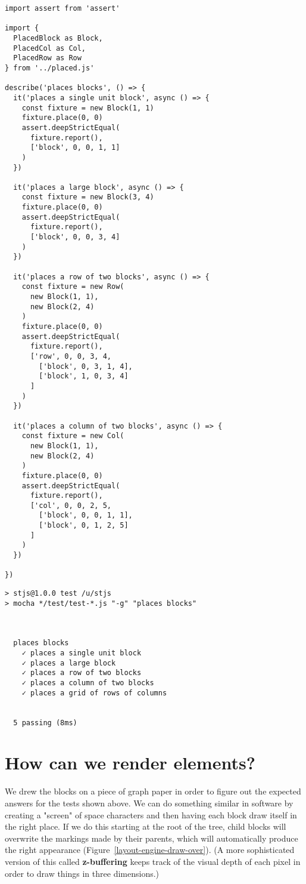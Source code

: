 \documentclass[krantzl]{krantz}
\newcommand{\figref}[1]{Figure~\ref{#1}}
\newcommand{\glossref}[1]{\textbf{#1}}
\begin{document}
\begin{lstlisting}[frame=single,frameround=tttt]
import assert from 'assert'

import {
  PlacedBlock as Block,
  PlacedCol as Col,
  PlacedRow as Row
} from '../placed.js'

describe('places blocks', () => {
  it('places a single unit block', async () => {
    const fixture = new Block(1, 1)
    fixture.place(0, 0)
    assert.deepStrictEqual(
      fixture.report(),
      ['block', 0, 0, 1, 1]
    )
  })

  it('places a large block', async () => {
    const fixture = new Block(3, 4)
    fixture.place(0, 0)
    assert.deepStrictEqual(
      fixture.report(),
      ['block', 0, 0, 3, 4]
    )
  })

  it('places a row of two blocks', async () => {
    const fixture = new Row(
      new Block(1, 1),
      new Block(2, 4)
    )
    fixture.place(0, 0)
    assert.deepStrictEqual(
      fixture.report(),
      ['row', 0, 0, 3, 4,
        ['block', 0, 3, 1, 4],
        ['block', 1, 0, 3, 4]
      ]
    )
  })

  it('places a column of two blocks', async () => {
    const fixture = new Col(
      new Block(1, 1),
      new Block(2, 4)
    )
    fixture.place(0, 0)
    assert.deepStrictEqual(
      fixture.report(),
      ['col', 0, 0, 2, 5,
        ['block', 0, 0, 1, 1],
        ['block', 0, 1, 2, 5]
      ]
    )
  })

})
\end{lstlisting}



\begin{lstlisting}[frame=single,frameround=tttt]
> stjs@1.0.0 test /u/stjs
> mocha */test/test-*.js "-g" "places blocks"



  places blocks
    ✓ places a single unit block
    ✓ places a large block
    ✓ places a row of two blocks
    ✓ places a column of two blocks
    ✓ places a grid of rows of columns


  5 passing (8ms)
\end{lstlisting}


\section{How can we render elements?}\label{layout-engine-render}


We drew the blocks on a piece of graph paper
in order to figure out the expected answers for the tests shown above.
We can do something similar in software by creating a "screen" of space characters
and then having each block draw itself in the right place.
If we do this starting at the root of the tree,
child blocks will overwrite the markings made by their parents,
which will automatically produce the right appearance
(\figref{layout-engine-draw-over}).
(A more sophisticated version of this called \glossref{z-buffering}
keeps track of the visual depth of each pixel
in order to draw things in three dimensions.)
\end{document}
